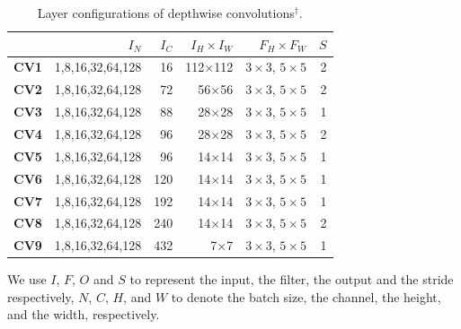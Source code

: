 \begin{table}[]
\caption{Layer configurations of depthwise  convolutions$^{\dag}$.}
\label{tab:depconvconfigs}
\centering
{}
\begin{threeparttable}
\begin{tabular}{lrrrrr}
\toprule
& \textbf{$I_N$} & \textbf{$I_C$} & \textbf{$I_H \times I_W$ }&  \textbf{$F_H \times F_W$} &\textbf{$S$}\\
\midrule
\textbf{CV1} & 1,8,16,32,64,128  & 16    & 112$\times$112 & $3 \times 3$, $5 \times 5$&2  \\
\textbf{CV2} & 1,8,16,32,64,128  & 72    & 56$\times$56  &$3 \times 3$, $5 \times 5$  &2 \\
\textbf{CV3} & 1,8,16,32,64,128  & 88   & 28$\times$28  &$3 \times 3$, $5 \times 5$   &1 \\
\textbf{CV4} & 1,8,16,32,64,128  & 96    & 28$\times$28  &$3 \times 3$, $5 \times 5$  &2  \\
\textbf{CV5} & 1,8,16,32,64,128  & 96   & 14$\times$14  &$3 \times 3$, $5 \times 5$   &1 \\
\textbf{CV6} & 1,8,16,32,64,128  & 120   & 14$\times$14  &$3 \times 3$, $5 \times 5$  &1  \\
\textbf{CV7} & 1,8,16,32,64,128  & 192   & 14$\times$14  &$3 \times 3$, $5 \times 5$  &1  \\
\textbf{CV8} & 1,8,16,32,64,128  & 240   & 14$\times$14  &$3 \times 3$, $5 \times 5$  &2  \\
\textbf{CV9} & 1,8,16,32,64,128  & 432   & 7$\times$7  &$3 \times 3$, $5 \times 5$    &1\\

\bottomrule
\end{tabular}
\footnotesize
\begin{tablenotes}
\item[\dag] We use $I$, $F$, $O$ and $S$ to represent the input, the filter, the output and the stride respectively, $N$, $C$, $H$, and $W$
to denote the batch size, the channel, the height, and the width, respectively.
\end{tablenotes}
\end{threeparttable}
\vspace{-5mm}
\end{table}


